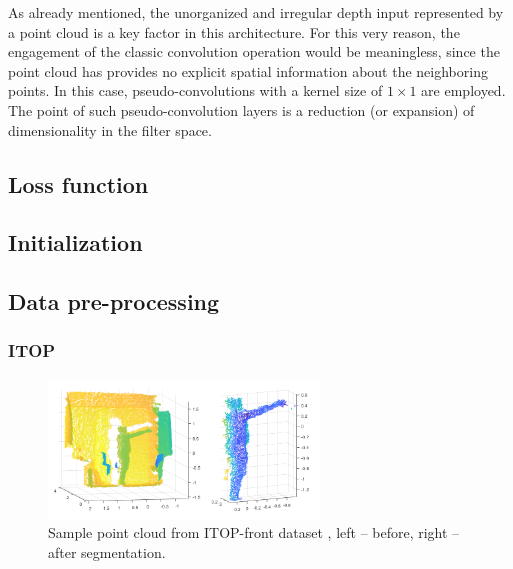 \noindent
As already mentioned, the unorganized and irregular depth input represented by a point cloud is a key factor in this architecture. For this very reason, the engagement of the classic convolution operation would be meaningless, since the point cloud has provides no explicit spatial information about the neighboring points. In this case, pseudo-convolutions with a kernel size of $1\times1$ are employed. The point of such pseudo-convolution layers is a reduction (or expansion) of dimensionality in the filter space. %

\subsection{Loss function}

\subsection{Initialization}


\subsection{Data pre-processing}

\subsubsection{ITOP}


\begin{figure}[H]
\begin{center}
  \includegraphics[height=140px]{images/implementation/itop_seg.png}
  \caption[Sample point cloud from ITOP-front dataset \cite{haque2016viewpoint}.]{ Sample point cloud from ITOP-front dataset \cite{haque2016viewpoint}, left – before, right – after segmentation.}
  \label{fig:itop_seg}
\end{center}
\end{figure}

